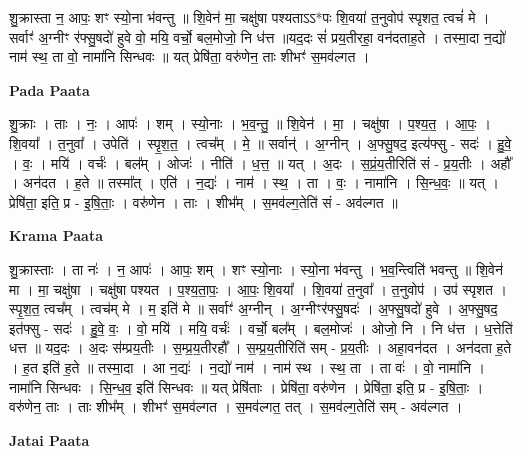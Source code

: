 \documentclass[17pt]{extarticle}
\begin{document}
शु॒क्रास्ता न॒ आपः॒ शꣳ स्यो॒ना भ॑वन्तु ॥ शि॒वेन॑ मा॒ चक्षु॑षा पश्यताऽऽ*पः शि॒वया॑ त॒नुवोप॑ स्पृशत॒ त्वचं॑ मे ।सर्वाꣳ॑ अ॒ग्नीꣳ र॑फ्सु॒षदो॑ हुवे वो॒ मयि॒ वर्चो॒ बल॒मोजो॒ नि ध॑त्त ॥यद॒दः सं॑ प्रय॒॒तीरहा॒॒ वन॑दताह॒ते । तस्मा॒दा न॒द्यो॑ नाम॑ स्थ॒ ता वो॒ नामा॑नि सिन्धवः ॥ यत् प्रेषि॑ता॒ वरु॑णेन॒ ताः शीभꣳ॑ स॒मव॑ल्गत । \newline

\textbf{Pada Paata} \newline

शु॒क्राः । ताः । नः॒ । आपः॑ । शम् । स्यो॒नाः । भ॒व॒न्तु॒ ॥ शि॒वेन॑ । मा॒ । चक्षु॑षा । प॒श्य॒त॒ । आ॒पः॒ । शि॒वया᳚ । त॒नुवा᳚ । उपेति॑ । स्पृ॒श॒त॒ । त्वच᳚म् । मे॒ ॥ सर्वान्॑ । अ॒ग्नीन् । अ॒फ्सु॒षद॒ इत्य॑फ्सु - सदः॑ । हु॒वे॒ । वः॒ । मयि॑ । वर्चः॑ । बल᳚म् । ओजः॑ । नीति॑ । ध॒त्त॒ ॥ यत् । अ॒दः । स॒प्रं॒य॒तीरिति॑ सं - प्र॒य॒तीः । अहौ᳚ । अन॑दत । ह॒ते ॥ तस्मा᳚त् । एति॑ । न॒द्यः॑ । नाम॑ । स्थ॒ । ता । वः॒ । नामा॑नि । सि॒न्ध॒वः॒ ॥ यत् । प्रेषि॑ता॒ इति॒ प्र - इ॒षि॒ताः॒ । वरु॑णेन । ताः । शीभ᳚म् । स॒मव॑ल्ग॒तेति॑ सं - अव॑ल्गत ॥  \newline


\textbf{Krama Paata} \newline

शु॒क्रास्ताः । ता नः॑ । न॒ आपः॑ । आपः॒ शम् । शꣳ स्यो॒नाः । स्यो॒ना भ॑वन्तु । भ॒व॒न्त्विति॑ भवन्तु ॥ शि॒वेन॑ मा । मा॒ चक्षु॑षा । चक्षु॑षा पश्यत । प॒श्य॒ता॒पः॒ । आ॒पः॒ शि॒वया᳚ । शि॒वया॑ त॒नुवा᳚ । त॒नुवोप॑ । उप॑ स्पृशत । स्पृ॒श॒त॒ त्वच᳚म् । त्वच॑म् मे । म॒ इति॑ मे ॥ सर्वाꣳ॑ अ॒ग्नीन् । अ॒ग्नीꣳर॑फ्सु॒षदः॑ । अ॒फ्सु॒षदो॑ हुवे । अ॒फ्सु॒षद॒ इत॑फ्सु - सदः॑ । हु॒वे॒ वः॒ । वो॒ मयि॑ । मयि॒ वर्चः॑ । वर्चो॒ बल᳚म् । बल॒मोजः॑ । ओजो॒ नि । नि ध॑त्त । ध॒त्तेति॑ धत्त ॥ यद॒दः । अ॒दः स॑म्प्रय॒तीः । स॒म्प्र॒य॒तीरहौ᳚ । स॒म्प्र॒य॒तीरिति॑ सम् - प्र॒य॒तीः । अहा॒वन॑दत । अन॑दता ह॒ते । ह॒त इति॑ ह॒ते ॥ तस्मा॒दा । आ न॒द्यः॑ । न॒द्यो॑ नाम॑ । नाम॑ स्थ । स्थ॒ ता । ता वः॑ । वो॒ नामा॑नि । नामा॑नि सिन्धवः । सि॒न्ध॒व॒ इति॑ सिन्धवः ॥ यत् प्रेषि॑ताः । प्रेषि॑ता॒ वरु॑णेन । प्रेषि॑ता॒ इति॒ प्र - इ॒षि॒ताः॒ । वरु॑णेन॒ ताः । ताः शीभ᳚म् । शीभꣳ॑ स॒मव॑ल्गत । स॒मव॑ल्गत॒ तत् । स॒मव॑ल्ग॒तेति॑ सम् - अव॑ल्गत । \newline

\textbf{Jatai Paata} \newline
\end{document}
